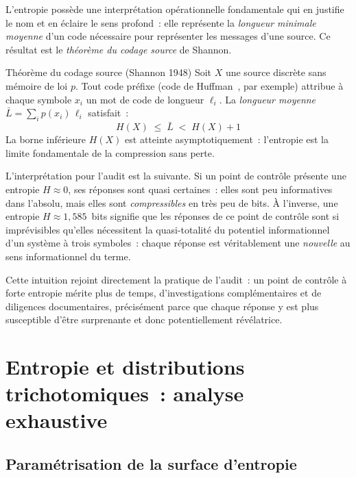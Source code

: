 L'entropie possède une interprétation opérationnelle fondamentale qui en justifie
le nom et en éclaire le sens profond~: elle représente la \emph{longueur minimale
moyenne} d'un code nécessaire pour représenter les messages d'une source. Ce
résultat est le \emph{théorème du codage source} de Shannon.

\begin{boiteTheoreme}{Théorème du codage source (Shannon 1948)}
Soit $X$ une source discrète sans mémoire de loi $p$. Tout code préfixe
(code de Huffman~\cite{Huffman1952}, par exemple) attribue à chaque symbole $x_i$
un mot de code de longueur $\ell_i$. La \emph{longueur moyenne} $\bar{L} =
\sum_i p(x_i)\,\ell_i$ satisfait~:
\begin{equation}
  H(X) \;\leq\; \bar{L} \;<\; H(X) + 1
  \label{eq:codage-source}
\end{equation}
La borne inférieure $H(X)$ est atteinte asymptotiquement~: l'entropie est la
limite fondamentale de la compression sans perte.
\end{boiteTheoreme}

L'interprétation pour l'audit est la suivante. Si un point de contrôle présente
une entropie $H \approx 0$, ses réponses sont quasi certaines~: elles sont peu
informatives dans l'absolu, mais elles sont \emph{compressibles} en très peu de
bits. À l'inverse, une entropie $H \approx 1{,}585$~bits signifie que les
réponses de ce point de contrôle sont si imprévisibles qu'elles nécessitent la
quasi-totalité du potentiel informationnel d'un système à trois symboles~: chaque
réponse est véritablement une \emph{nouvelle} au sens informationnel du terme.

Cette intuition rejoint directement la pratique de l'audit~: un point de contrôle
à forte entropie mérite plus de temps, d'investigations complémentaires et de
diligences documentaires, précisément parce que chaque réponse y est plus
susceptible d'être surprenante et donc potentiellement révélatrice.

\section{Entropie et distributions trichotomiques~: analyse exhaustive}
\label{sec:trichotomique}

\subsection{Paramétrisation de la surface d'entropie}

